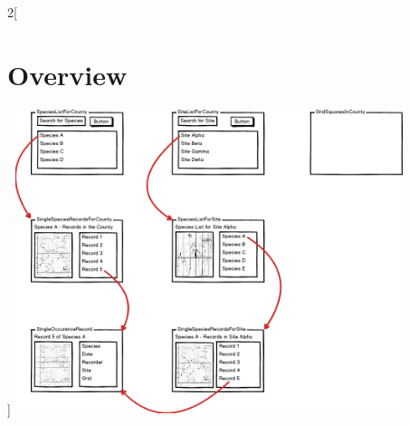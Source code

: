 \documentclass[a4paper,12pt,landscape]{article}
\begin{document}
\begin{multicols*}{2}[%
  \section{Overview}%
]
  \includegraphics[width=0.85\textwidth,height=\textheight,keepaspectratio]{./wireframes/overview.png}%
  \clearpage
\end{multicols*}
\end{document}
